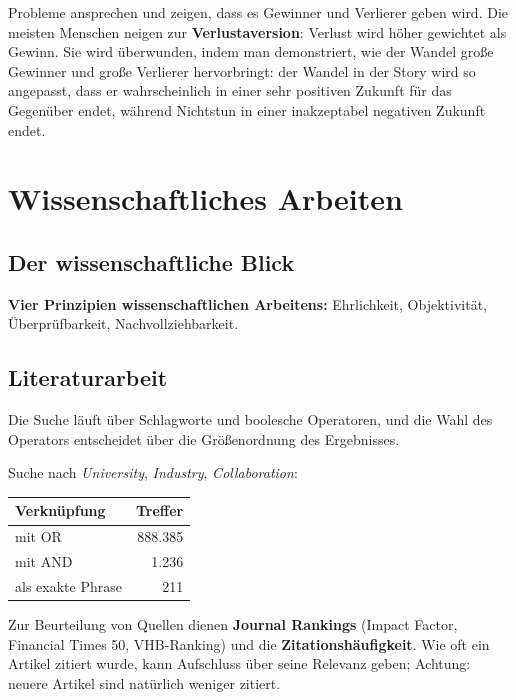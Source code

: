 \documentclass[12pt, a4paper]{article}
\begin{document}
Probleme ansprechen und zeigen, dass es Gewinner und Verlierer geben wird.
Die meisten Menschen neigen zur \textbf{Verlustaversion}: Verlust wird höher
gewichtet als Gewinn. Sie wird überwunden, indem man demonstriert, wie der
Wandel große Gewinner und große Verlierer hervorbringt: der Wandel in der
Story wird so angepasst, dass er wahrscheinlich in einer sehr positiven
Zukunft für das Gegenüber endet, während Nichtstun in einer inakzeptabel
negativen Zukunft endet.

\section{Wissenschaftliches Arbeiten}

\subsection{Der wissenschaftliche Blick}

\begin{definitionbox}
\textbf{Vier Prinzipien wissenschaftlichen Arbeitens:} Ehrlichkeit,
Objektivität, Überprüfbarkeit, Nachvollziehbarkeit.
\end{definitionbox}

\subsection{Literaturarbeit}

Die Suche läuft über Schlagworte und boolesche Operatoren, und die Wahl des
Operators entscheidet über die Größenordnung des Ergebnisses.

\begin{examplebox}
Suche nach \emph{University}, \emph{Industry}, \emph{Collaboration}:
\begin{center}
\begin{tabular}{lr}
\textbf{Verknüpfung} & \textbf{Treffer}\\\hline
mit OR & 888.385\\
mit AND & 1.236\\
als exakte Phrase & 211\\
\end{tabular}
\end{center}
\end{examplebox}

Zur Beurteilung von Quellen dienen \textbf{Journal Rankings} (Impact Factor,
Financial Times 50, VHB-Ranking) und die \textbf{Zitationshäufigkeit}. Wie
oft ein Artikel zitiert wurde, kann Aufschluss über seine Relevanz geben;
Achtung: neuere Artikel sind natürlich weniger zitiert.
\end{document}
